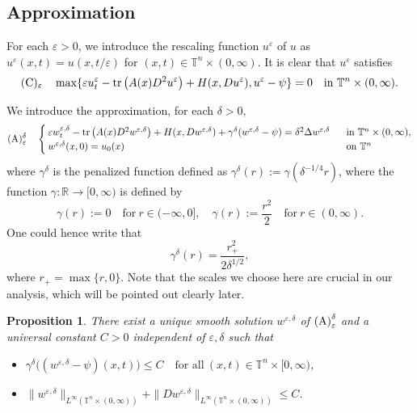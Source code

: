 \documentclass[12pt,reqno]{amsart}
\theoremstyle{plain}
\newtheorem{prop}[thm]{Proposition}
\theoremstyle{remark}
\numberwithin{equation}{section}
\begin{document}
 
\subsection{Approximation} 
For each ${\varepsilon}>0$, we introduce the rescaling function $u^{\varepsilon}$ of $u$ as  $u^{\varepsilon}(x,t)=u(x,t/{\varepsilon})$ for $(x,t)\in {\mathbb{T}^{n}\times(0,\infty)}$. It is clear that $u^{\varepsilon}$ satisfies
$$
{\rm (C)_{\varepsilon}} \quad
\max\{{\varepsilon} u^{\varepsilon}_t-{{\rm tr}\,}\big(A(x)D^2u^{\varepsilon}\big)+H(x,Du^{\varepsilon}), u^{\varepsilon}-\psi\}=0 \quad \text{in} \ {\mathbb{T}^{n}\times(0,\infty)}.
$$

We introduce the approximation, for each ${\delta}>0$,
\begin{equation}\notag
{\rm(A)_{\varepsilon}^{\delta}}\quad
\begin{cases}
{\varepsilon} w^{{\varepsilon}, \delta}_t -{{\rm tr}\,}\big(A(x)D^2w^{{\varepsilon},\delta}\big)+ H(x,Dw^{{\varepsilon}, \delta}) 
+{\gamma}^{\delta}(w^{{\varepsilon},\delta}-\psi)={\delta}^{2}{\Delta} w^{{\varepsilon},{\delta}}\ 
& \text{ in }{\mathbb{T}^{n}\times(0,\infty)},  \\
w^{{\varepsilon}, {\delta}}(x,0)=u_{0}(x)  & \text{ on } {\mathbb{T}}^{n}
\end{cases}
\end{equation} 
 where ${\gamma}^{\delta}$ is the penalized function defined as ${\gamma}^{\delta}(r):={\gamma}({\delta}^{-1/4}r)$, where 
the function ${\gamma}:{\mathbb{R}}\to[0,\infty)$ is defined by 
\[
{\gamma}(r):=0 \quad \text{for} \ r\in(-\infty,0], \quad
{\gamma}(r):=\frac{r^2}{2} \quad \text{for} \ r\in(0,\infty). 
\]
One could hence write that
$$
{\gamma}^{\delta}(r)=\frac{r_+^2}{2 {\delta}^{1/2}},
$$
where $r_+=\max\{r,0\}$. 
Note that the scales we choose here are crucial in our analysis, 
which will be pointed out clearly later.

\begin{prop}\label{prop:est1} 
There exist a unique smooth solution $w^{{\varepsilon},{\delta}}$ of ${\rm (A)}_{\varepsilon}^{\delta}$ 
and a universal constant $C>0$ independent of ${\varepsilon},{\delta}$ such that 
\begin{itemize}
\item[(i)]
${\gamma}^{\delta}\big( (w^{{\varepsilon},{\delta}}-\psi)(x,t)\big)\le C \quad \text{for all} \ (x,t)\in{\mathbb{T}^{n}\times[0,\infty)}$, 
\item[(ii)]
$\|w^{{\varepsilon},{\delta}}\|_{{L^{\infty}}({\mathbb{T}^{n}\times(0,\infty)})}+\|Dw^{{\varepsilon},{\delta}}\|_{{L^{\infty}}({\mathbb{T}^{n}\times(0,\infty)})}\le C$.
 \end{itemize}
\end{prop}
\end{document}
